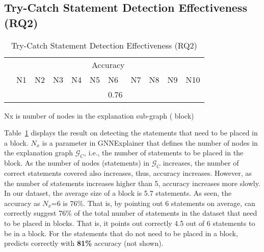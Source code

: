 \subsection{Try-Catch Statement Detection Effectiveness (RQ2)}
\label{sec:rq2}

\begin{table}[t]
  \caption{Try-Catch Statement Detection Effectiveness (RQ2)}
  \vspace{-12pt}
	\begin{center}
		\small
		\renewcommand{\arraystretch}{1} 
		\begin{tabular}{p{0.8cm}<{\centering}|p{0.4cm}<{\centering}|p{0.4cm}<{\centering}|p{0.4cm}<{\centering}|p{0.4cm}<{\centering}|p{0.4cm}<{\centering}|p{0.4cm}<{\centering}|p{0.4cm}<{\centering}|p{0.4cm}<{\centering}|p{0.4cm}<{\centering}|p{0.4cm}<{\centering}}
			\hline
			 	&  \multicolumn{10}{c}{Accuracy} \\
			\cline{2-11}
			     	&  N1  & N2   &  N3  & N4   &N5    & N6   &N7    & N8   &N9    & N10 \\
			\hline
			\tool       &  &  &  &  &  & 0.76 &  &  &  &   \\
			\hline
		\end{tabular}
		Nx is number of nodes in the explanation
                sub-graph ( block)
		\label{tab:rq2}
	\end{center}
\end{table}

Table~\ref{tab:rq2} displays the result on detecting the statements
that need to be placed in a  block. $N_x$ is a parameter
in GNNExplainer that defines the number of nodes in the explanation
graph $\mathcal{G}_C$, i.e., the number of statements to be placed in the
 block.
%
As the number of nodes (statements) in $\mathcal{G}_C$ increases, the
number of correct statements covered also increases, thus, accuracy
increases. However, as the number of statements increases higher than
5, accuracy increases more slowly. In our dataset, the average size of
a  block is 5.7 statements. As seen, the accuracy as
$N_x$=6 is 76\%. That is, by pointing out 6 statements on average,
{\tool} can correctly suggest 76\% of the total number of statements
in the dataset that need to be placed in 
blocks. That is, it points out correctly 4.5 out of 6 statements to be
in a  block. For the statements that do not need to be
placed in a  block, {\tool} predicts correctly with
{\bf 81\%} accuracy (not shown).

